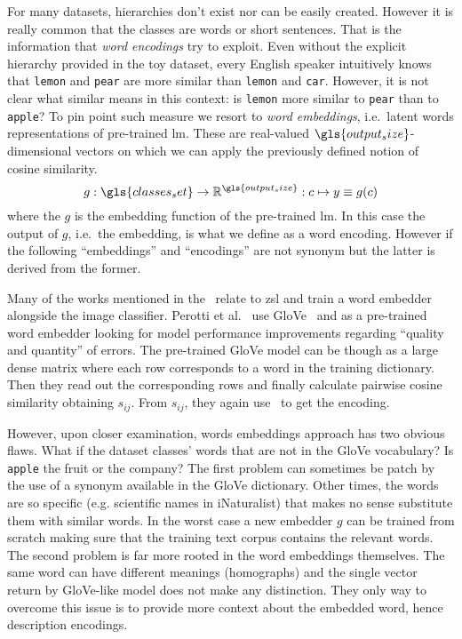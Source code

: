 For many datasets, hierarchies don't exist nor can be easily created. However it is really common that the classes are words or short sentences. That is the information that \emph{word encodings} try to exploit. Even without the explicit hierarchy provided in the toy dataset, every English speaker intuitively knows that \texttt{lemon} and \texttt{pear} are more similar than \texttt{lemon} and \texttt{car}.
However, it is not clear what similar means in this context: is \texttt{lemon} more similar to \texttt{pear} than to \texttt{apple}? To pin point such measure we resort to \emph{word embeddings}, i.e.\ latent words representations of pre-trained \acrshort{lm}. These are real-valued $\gls{output_size}$-dimensional vectors on which we can apply the previously defined notion of cosine similarity.
\begin{equation}
  g : \gls{classes_set} \to \mathbb{R}^{\gls{output_size}} :
  c \mapsto y \equiv g(c)
  \label{eq:word-encoding}
\end{equation}
where the $g$ is the embedding function of the pre-trained \acrshort{lm}.
In this case the output of $g$, i.e.\ the embedding, is what we define as a word encoding. However if the following ``embeddings'' and ``encodings'' are not synonym but the latter is derived from the former.

Many of the works mentioned in the~ relate to \acrshort{zsl} and train a word embedder alongside the image classifier.
Perotti et al.~\cite{BeyondOneHotPerott2023} use GloVe~\cite{GloveGlobalVPennin2014} and as a pre-trained word embedder looking for model performance improvements regarding ``quality and quantity'' of errors. The pre-trained GloVe model can be though as a large dense matrix where each row corresponds to a word in the training dictionary. Then they read out the corresponding rows and finally calculate pairwise cosine similarity obtaining $s_{ij}$. From $s_{ij}$, they again use~ to get the encoding.

However, upon closer examination, words embeddings approach has two obvious flaws.
What if the dataset classes' words that are not in the GloVe vocabulary?
Is \texttt{apple} the fruit or the company?
The first problem can sometimes be patch by the use of a synonym available in the GloVe dictionary. Other times, the words are so specific (e.g. scientific names in iNaturalist) that makes no sense substitute them with similar words. In the worst case a new embedder $g$ can be trained from scratch making sure that the training text corpus contains the relevant words.
The second problem is far more rooted in the word embeddings themselves. The same word can have different meanings (homographs) and the single vector return by GloVe-like model does not make any distinction. They only way to overcome this issue is to provide more context about the embedded word, hence description encodings.

